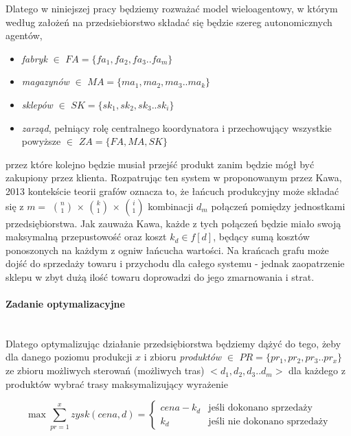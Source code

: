 \documentclass{article}
\begin{document}
 Dlatego w niniejszej pracy będziemy rozważać model wieloagentowy, w którym według założeń na przedsiebiorstwo składać się będzie szereg autonomicznych agentów,
	\begin{itemize} 
		\item \textit{fabryk} $\in$ $FA = \{fa_1,fa_2,fa_3..fa_m\} $ 
		\item \textit{magazynów} $\in$ $MA = \{ma_1,ma_2,ma_3..ma_k\} $ 
		\item \textit{sklepów} $\in$ $SK = \{sk_1,sk_2,sk_3..sk_i\} $
		\item \textit{zarząd}, pełniący rolę centralnego koordynatora i przechowujący wszystkie powyższe $\in$ $ZA = \{FA,MA,SK\} $
	\end{itemize}

przez które kolejno będzie musiał przejść produkt zanim będzie mógł być zakupiony przez klienta. Rozpatrując ten system w proponowanym przez Kawa, 2013 kontekście teorii grafów oznacza to, że łańcuch produkcyjny może składać się z $m= $ $n\choose 1 $ $ \times $ $k\choose 1 $ $ \times $ $i\choose 1 $ kombinacji $d_m$ połączeń pomiędzy jednostkami przedsiębiorstwa. Jak zauważa Kawa, każde z tych połączeń będzie miało swoją maksymalną przepustowość oraz koszt $k_d \in f[d]$, będący sumą kosztów ponoszonych na każdym z ogniw łańcucha wartości. Na krańcach grafu może dojść do sprzedaży towaru i przychodu dla całego systemu - jednak zaopatrzenie sklepu w zbyt dużą ilość towaru doprowadzi do jego zmarnowania i strat. 

\paragraph{Zadanie optymalizacyjne} \mbox{}\\
Dlatego optymalizując działanie przedsiębiorstwa będziemy dążyć do tego, żeby dla danego poziomu produkcji $x$ i zbioru \textit{produktów} $\in$ $PR = \{pr_1,pr_2,pr_3..pr_x\} $ ze zbioru możliwych sterowań (możliwych tras) $<d_1,d_2,d_3..d_m>$ dla każdego z produktów wybrać trasy maksymalizujący wyrażenie

\begin{equation} \label{eq:teoria1}
\max \sum\limits_{pr=1}^x  zysk (cena,d) = \begin{cases}
cena - k_d &\text{jeśli dokonano sprzedaży}\\
k_d &\text{jeśli nie dokonano sprzedaży}
\end{cases}
\end{equation}
\end{document}
